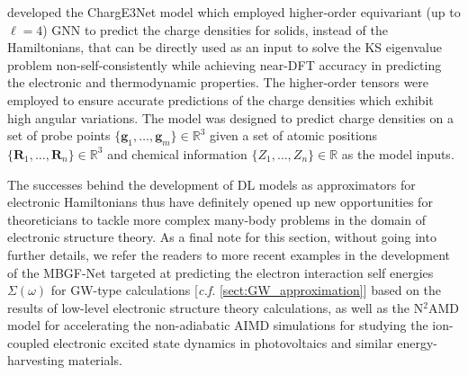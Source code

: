 \citet{Koker2024-vs} developed the ChargE3Net model which employed higher-order equivariant (up to $\ell=4$) GNN to predict the charge densities for solids, instead of the Hamiltonians, that can be directly used as an input to solve the KS eigenvalue problem non-self-consistently while achieving near-DFT accuracy in predicting the electronic and thermodynamic properties. The higher-order tensors were employed to ensure accurate predictions of the charge densities which exhibit high angular variations. The model was designed to predict charge densities on a set of probe points $\{\bm{g}_1,\ldots,\bm{g}_{m}\}\in\mathbb{R}^{3}$ given a set of atomic positions $\{\bm{R}_1,\ldots,\bm{R}_n\}\in\mathbb{R}^3$ and chemical information $\{Z_1,\ldots,Z_n\}\in\mathbb{R}$ as the model inputs.

The successes behind the development of DL models as approximators for electronic Hamiltonians thus have definitely opened up new opportunities for theoreticians to tackle more complex many-body problems in the domain of electronic structure theory. As a final note for this section, without going into further details, we refer the readers to more recent examples in the development of the MBGF-Net\cite{Venturella2025-fh} targeted at predicting the electron interaction self energies $\Sigma(\omega)$ for GW-type calculations [\emph{c.f.} \cref{sect:GW_approximation}] based on the results of low-level electronic structure theory calculations, as well as the N$^2$AMD\cite{Zhang2025-sk} model for accelerating the non-adiabatic AIMD simulations for studying the ion-coupled electronic excited state dynamics in photovoltaics and similar energy-harvesting materials.

